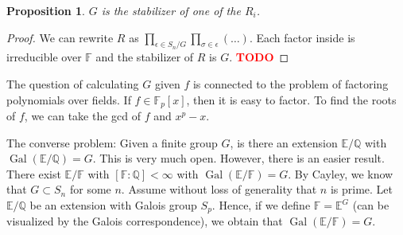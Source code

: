 \documentclass{article}
\theoremstyle{plain}
\newtheorem{proposition}[theorem]{Proposition}
\theoremstyle{definition}
\newcommand{\Q}{\mathbb{Q}}
\newcommand{\F}{\mathbb{F}}
\newcommand{\E}{\mathbb{E}}
\DeclareMathOperator{\Gal}{Gal}
\newcommand{\td}{\textcolor{red}{\textbf{TODO}}}
\begin{document}
\begin{proposition}
    $G$ is the stabilizer of one of the $R_i$.
\end{proposition}

\begin{proof}
    We can rewrite $R$ as $\prod_{\epsilon \in S_n / G}\prod_{\sigma \in \epsilon}(\dots)$. Each factor inside is irreducible over $\F$ and the stabilizer of $R$ is $G$. \td 
\end{proof}

The question of calculating $G$ given $f$ is connected to the problem of factoring polynomials over fields. If $f \in \F_p[x]$, then it is easy to factor. To find the roots of $f$, we can take the gcd of $f$ and $x^p - x$.

The converse problem: Given a finite group $G$, is there an extension $\E / \Q$ with $\Gal(\E / \Q) = G$. This is very much open. However, there is an easier result. There exist $\E / \F$ with $[\F : \Q] < \infty$ with $\Gal(\E / \F) = G$. By Cayley, we know that $G \subset S_n$ for some $n$. Assume without loss of generality that $n$ is prime. Let $\E / \Q$ be an extension with Galois group $S_p$. Hence, if we define $\F = \E^G$ (can be visualized by the Galois correspondence), we obtain that $\Gal(\E / \F) = G$.
\end{document}
